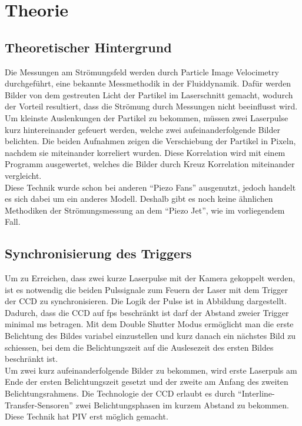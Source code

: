 \section{Theorie}
\subsection{Theoretischer Hintergrund}
Die Messungen am Strömungsfeld werden durch Particle Image Velocimetry durchgeführt, eine bekannte Messmethodik in der Fluiddynamik. Dafür werden Bilder von dem gestreuten Licht der Partikel im Laserschnitt gemacht, wodurch der Vorteil resultiert, dass die Strömung durch Messungen nicht beeinflusst wird. Um kleinste Auslenkungen der Partikel zu bekommen, müssen zwei Laserpulse kurz hintereinander gefeuert werden, welche zwei aufeinanderfolgende Bilder belichten. Die beiden Aufnahmen zeigen die Verschiebung der Partikel in Pixeln, nachdem sie miteinander korreliert wurden. Diese Korrelation wird mit einem Programm ausgewertet, welches die Bilder durch Kreuz Korrelation miteinander vergleicht.\\
Diese Technik wurde schon bei anderen "`Piezo Fans"' ausgenutzt, jedoch handelt es sich dabei um ein anderes Modell. Deshalb gibt es noch keine ähnlichen Methodiken der Strömungsmessung an dem "`Piezo Jet"', wie im vorliegendem Fall.
\subsection{Synchronisierung des Triggers}
Um zu Erreichen, dass zwei kurze Laserpulse mit der Kamera gekoppelt werden, ist es notwendig die beiden Pulssignale zum Feuern der Laser mit dem Trigger der CCD zu synchronisieren. Die Logik der Pulse ist in Abbildung dargestellt.\\
Dadurch, dass die CCD auf fps beschränkt ist darf der Abstand zweier Trigger minimal ms betragen. Mit dem Double Shutter Modus ermöglicht man die erste Belichtung des Bildes variabel einzustellen und kurz danach ein nächstes Bild zu schiessen, bei dem die Belichtungszeit auf die Auslesezeit des ersten Bildes beschränkt ist.\\
Um zwei kurz aufeinanderfolgende Bilder zu bekommen, wird erste Laserpuls am Ende der ersten Belichtungszeit gesetzt und der zweite am Anfang des zweiten Belichtungsrahmens. Die Technologie der CCD erlaubt es durch "`Interline-Transfer-Sensoren"' zwei Belichtungsphasen im kurzem Abstand zu bekommen. Diese Technik hat PIV erst möglich gemacht.\\
